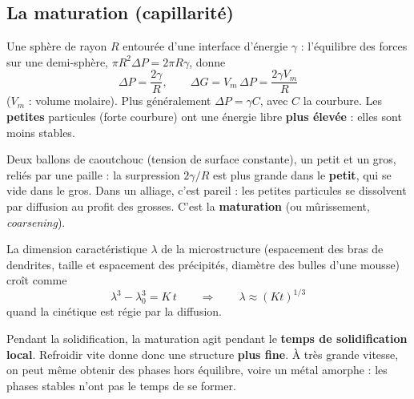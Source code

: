 \subsection*{La maturation (capillarité)}

\begin{thmbox}[title={Surpression dans une sphère et instabilité des petites particules}]
Une sphère de rayon $R$ entourée d'une interface d'énergie $\gamma$ : l'équilibre des forces sur
une demi-sphère, $\pi R^2\Delta P = 2\pi R\gamma$, donne
\[ \Delta P = \frac{2\gamma}{R}, \qquad \Delta G = V_m\,\Delta P = \frac{2\gamma V_m}{R} \]
($V_m$ : volume molaire). Plus généralement $\Delta P = \gamma C$, avec $C$ la courbure. Les
\textbf{petites} particules (forte courbure) ont une énergie libre \textbf{plus élevée} : elles
sont moins stables.
\end{thmbox}


\begin{exbox}[title={La question des deux ballons (diapositives)}]
Deux ballons de caoutchouc (tension de surface constante), un petit et un gros, reliés par une
paille : la surpression $2\gamma/R$ est plus grande dans le \textbf{petit}, qui se vide dans le
gros. Dans un alliage, c'est pareil : les petites particules se dissolvent par diffusion au
profit des grosses. C'est la \textbf{maturation} (ou mûrissement, \emph{coarsening}).
\end{exbox}

\begin{thmbox}[title={Loi de maturation (à connaître par c\oe ur)}]
La dimension caractéristique $\lambda$ de la microstructure (espacement des bras de dendrites,
taille et espacement des précipités, diamètre des bulles d'une mousse) croît comme
\[ \lambda^3 - \lambda_0^3 = K\,t \qquad\Longrightarrow\qquad \lambda \approx (Kt)^{1/3} \]
quand la cinétique est régie par la diffusion.
\end{thmbox}


\begin{propbox}[title=Ce qui fixe la finesse d'une pièce coulée]
Pendant la solidification, la maturation agit pendant le \textbf{temps de solidification
local}. Refroidir vite donne donc une structure \textbf{plus fine}. À très grande vitesse, on peut
même obtenir des phases hors équilibre, voire un métal amorphe : les phases stables \og n'ont pas
le temps\fg{} de se former.
\end{propbox}

